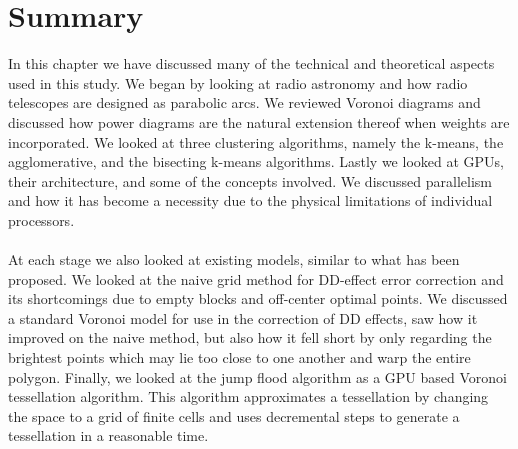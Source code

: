 \section{Summary}\label{sum}
In this chapter we have discussed many of the technical and theoretical aspects used in this study. We began by looking at radio astronomy and how radio telescopes are designed as parabolic arcs. We reviewed Voronoi diagrams and discussed how power diagrams are the natural extension thereof when weights are incorporated. We looked at three clustering algorithms, namely the k-means, the agglomerative, and the bisecting k-means algorithms. Lastly we looked at GPUs, their architecture, and some of the concepts involved. We discussed parallelism and how it has become a necessity due to the physical limitations of individual processors.
\\
\\
At each stage we also looked at existing models, similar to what has been proposed. We looked at the naive grid method for DD-effect error correction and its shortcomings due to empty blocks and off-center optimal points. We discussed a standard Voronoi model for use in the correction of DD effects, saw how it improved on the naive method, but also how it fell short by only regarding the brightest points which may lie too close to one another and warp the entire polygon. Finally, we looked at the jump flood algorithm as a GPU based Voronoi tessellation algorithm. This algorithm approximates a tessellation by changing the space to a grid of finite cells and uses decremental steps to generate a tessellation in a reasonable time.
